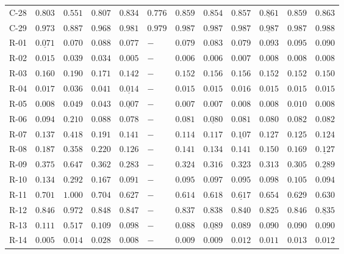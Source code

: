 {\begin{longtable}[t]{p{1cm}|p{1cm}|p{1cm}|p{1cm}|p{1cm}|p{1cm}|cccccc}
C-28 & $0.803$ & $0.551$ & $0.807$ & $0.834$ & $0.776$ & $0.859$ & $0.854$ & $0.857$ & $\underline{0.861}$ & $0.859$ & $\bm{0.863}$ \\
C-29 & $0.973$ & $0.887$ & $0.968$ & $0.981$ & $0.979$ & $0.987$ & $0.987$ & $0.987$ & $\underline{0.987}$ & $0.987$ & $\bm{0.988}$ \\
R-01 & $\underline{0.071}$ & $\bm{0.070}$ & $0.088$ & $0.077$ & $-$ & $0.079$ & $0.083$ & $0.079$ & $0.093$ & $0.095$ & $0.090$ \\
R-02 & $0.015$ & $0.039$ & $0.034$ & $\bm{0.005}$ & $-$ & $0.006$ & $0.006$ & $0.007$ & $0.008$ & $0.008$ & $0.008$ \\
R-03 & $0.160$ & $0.190$ & $0.171$ & $\bm{0.142}$ & $-$ & $0.152$ & $0.156$ & $0.156$ & $0.152$ & $0.152$ & $0.150$ \\
R-04 & $0.017$ & $0.036$ & $0.041$ & $\underline{0.014}$ & $-$ & $0.015$ & $0.015$ & $0.016$ & $0.015$ & $0.015$ & $0.015$ \\
R-05 & $0.008$ & $0.049$ & $0.043$ & $\underline{0.007}$ & $-$ & $0.007$ & $0.007$ & $0.008$ & $0.008$ & $0.010$ & $0.008$ \\
R-06 & $0.094$ & $0.210$ & $0.088$ & $\bm{0.078}$ & $-$ & $0.081$ & $\underline{0.080}$ & $0.081$ & $0.080$ & $0.082$ & $0.082$ \\
R-07 & $0.137$ & $0.418$ & $0.191$ & $0.141$ & $-$ & $0.114$ & $0.117$ & $\underline{0.107}$ & $0.127$ & $0.125$ & $0.124$ \\
R-08 & $0.187$ & $0.358$ & $0.220$ & $\bm{0.126}$ & $-$ & $0.141$ & $0.134$ & $0.141$ & $0.150$ & $0.169$ & $\underline{0.127}$ \\
R-09 & $0.375$ & $0.647$ & $0.362$ & $\bm{0.283}$ & $-$ & $0.324$ & $0.316$ & $0.323$ & $0.313$ & $0.305$ & $\underline{0.289}$ \\
R-10 & $0.134$ & $0.292$ & $0.167$ & $\bm{0.091}$ & $-$ & $0.095$ & $0.097$ & $0.095$ & $0.098$ & $0.105$ & $0.094$ \\
R-11 & $0.701$ & $1.000$ & $0.704$ & $0.627$ & $-$ & $\bm{0.614}$ & $0.618$ & $\underline{0.617}$ & $0.654$ & $0.629$ & $0.630$ \\
R-12 & $0.846$ & $0.972$ & $0.848$ & $0.847$ & $-$ & $0.837$ & $0.838$ & $0.840$ & $\bm{0.825}$ & $0.846$ & $\underline{0.835}$ \\
R-13 & $0.111$ & $0.517$ & $0.109$ & $0.098$ & $-$ & $\bm{0.088}$ & $\underline{0.089}$ & $0.089$ & $0.090$ & $0.090$ & $0.090$ \\
R-14 & $\bm{0.005}$ & $0.014$ & $0.028$ & $0.008$ & $-$ & $0.009$ & $0.009$ & $0.012$ & $0.011$ & $0.013$ & $0.012$ \\

\end{longtable}}
